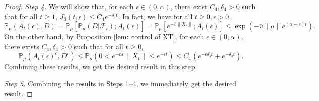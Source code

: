 \documentclass[EJP]{ejpecp} %
\begin{document}
\begin{proof}
	\emph{Step 4.} We will show that, for each $\epsilon\in (0,  \alpha)$, there exist $C_4,\delta_4>0$ such that for all $t\geq 1$, $J_3(t,\epsilon)\leq C_4e^{-\delta_4 t}.$
	In fact, we have  for all $t\geq 0, \epsilon >0$,
\[
  	\mathbb P_{\mu}(A_{t}(\epsilon), D)
  	= \mathbb P_{\mu}[\mathbb P_{\mu}(D|\mathscr F_t);A_t(\epsilon)]
  	= \mathbb P_\mu[e^{-\bar v\|X_t\|};A_t(\epsilon)]
  	\leq \exp({-\bar v \|\mu\|e^{(\alpha - \epsilon)t}}).
\]
	On the other hand, by Proposition \ref{lem: control of XT}, for each $\epsilon \in (0, \alpha)$, there exists  $C_{4}, \delta_{4}>0$ such that for all $t\geq 0$,
\[
  	\mathbb P_\mu(A_t(\epsilon)^c,D^c)
  	\leq \mathbb P_\mu(0 < e^{-\alpha t}\|X_t\|
  	\leq e^{ - \epsilon t}) \leq C_{4} (e^{-\epsilon \delta_{4} t}+e^{-\delta_{4} t}).
\]
 	Combining these results, we get the desired result in this step.

 	\emph{Step 5.} Combining the results in Steps 1--4, we immediately get the desired result.
\end{proof}
\end{document}

